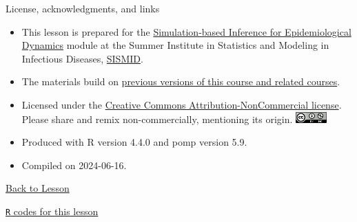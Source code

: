\documentclass[
  ignorenonframetext,
  aspectratio=169,
  t]{beamer}
\theoremstyle{definition}
\begin{document}
\begin{frame}[fragile]{License, acknowledgments, and links}
\label{license-acknowledgments-and-links}
\begin{itemize}
\item
  This lesson is prepared for the
  \href{https://kingaa.github.io/sbied/}{Simulation-based Inference for
  Epidemiological Dynamics} module at the Summer Institute in Statistics
  and Modeling in Infectious Diseases,
  \href{https://www.biostat.washington.edu/suminst/sismid}{SISMID}.
\item
  The materials build on \href{../acknowledge.html}{previous versions of
  this course and related courses}.
\item
  Licensed under the
  \href{https://creativecommons.org/licenses/by-nc/4.0/}{Creative
  Commons Attribution-NonCommercial license}. Please share and remix
  non-commercially, mentioning its origin.
  \includegraphics[height=12pt]{../graphics/cc-by-nc}
\item
  Produced with R version 4.4.0 and pomp version 5.9.
\item
  Compiled on 2024-06-16.
\end{itemize}

\href{index.html}{Back to Lesson}

\href{main.R}{\texttt{R} codes for this lesson}
\end{frame}
\end{document}
